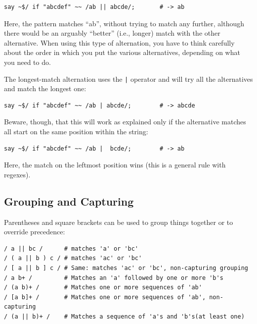 \begin{verbatim}
say ~$/ if "abcdef" ~~ /ab || abcde/;       # -> ab
\end{verbatim}
%

Here, the pattern matches ``ab'', without trying to match 
any further, although there would be an arguably ``better'' 
(i.e., longer) match with the other alternative. When using 
this type of alternation, you have to think carefully about 
the order in which you put the various alternatives, 
depending on what you need to do.

The longest-match alternation uses the \verb'|' operator 
and will try all the alternatives and match the longest one:

\begin{verbatim}
say ~$/ if "abcdef" ~~ /ab | abcde/;        # -> abcde
\end{verbatim}
%

Beware, though, that this will work as explained only if 
the alternative matches all start on the same position 
within the string:

\begin{verbatim}
say ~$/ if "abcdef" ~~ /ab |  bcde/;        # -> ab
\end{verbatim}
%

Here, the match on the leftmost position wins (this is 
a general rule with regexes).


\subsection{Grouping and Capturing}

Parentheses and square brackets can be used to group 
things together or to override precedence:

\begin{verbatim}
/ a || bc /      # matches 'a' or 'bc'
/ ( a || b ) c / # matches 'ac' or 'bc'
/ [ a || b ] c / # Same: matches 'ac' or 'bc', non-capturing grouping
/ a b+ /         # Matches an 'a' followed by one or more 'b's
/ (a b)+ /       # Matches one or more sequences of 'ab'
/ [a b]+ /       # Matches one or more sequences of 'ab', non-capturing
/ (a || b)+ /    # Matches a sequence of 'a's and 'b's(at least one)
\end{verbatim}
%

